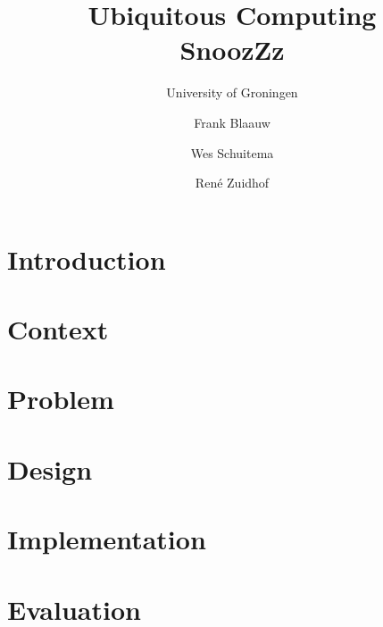 \documentclass{scrreprt}
\begin{document}
	\title{Ubiquitous Computing\\ SnoozZz}
	\author{Frank Blaauw \and Wes Schuitema \and Ren\'e Zuidhof}
	\subtitle{University of Groningen}
	\maketitle
	\tableofcontents
	\chapter{Introduction}
	\chapter{Context}
	\chapter{Problem}
	\chapter{Design}
	\chapter{Implementation}
	\chapter{Evaluation}
\end{document}
